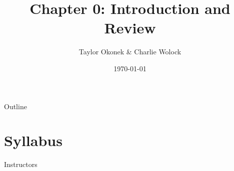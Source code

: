 \documentclass[10pt,t]{beamer}
\title{Chapter 0: Introduction and Review}
\author{Taylor Okonek \& Charlie Wolock}
\date{\today}
\begin{document}
	\begin{frame}
	\titlepage 
\end{frame}
\begin{frame}{Outline}
\tableofcontents
\end{frame}


\section{Syllabus}

\begin{frame}{Instructors}


\end{frame}
\end{document}
